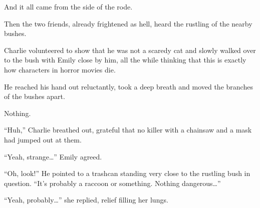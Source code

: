 And it all came from the side of the rode.

Then the two friends, already frightened as hell, heard the rustling of the nearby bushes.

Charlie volunteered to show that he was not a scaredy cat and slowly walked over to the bush with Emily close by him, all the while thinking that this is exactly how characters in horror movies die.

He reached his hand out reluctantly, took a deep breath and moved the branches of the bushes apart.

Nothing.

“Huh,” Charlie breathed out, grateful that no killer with a chainsaw and a mask had jumped out at them.

“Yeah, strange…” Emily agreed.

“Oh, look!” He pointed to a trashcan standing very close to the rustling bush in question. “It’s probably a raccoon or something. Nothing dangerous…”

“Yeah, probably…” she replied, relief filling her lungs.